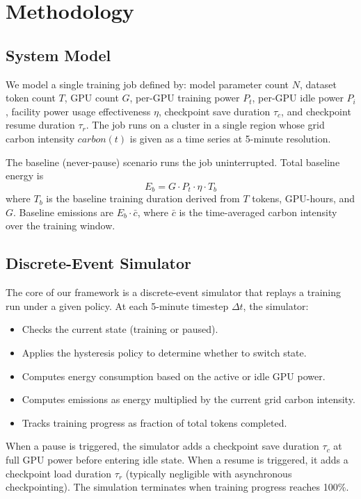 
\chapter{Methodology}
\label{sec:methodology}

\section{System Model}
\label{sec:system-model}

We model a single training job defined by: model parameter count $N$, dataset
token count $T$, GPU count $G$, per-GPU training power $P_t$, per-GPU idle
power $P_i$, facility power usage effectiveness $\eta$, checkpoint save duration $\tau_c$, and
checkpoint resume duration $\tau_r$.  The job runs on a cluster in a single
region whose grid carbon intensity $carbon(t)$ is given as a time series at
5-minute resolution.

The baseline (never-pause) scenario runs the job uninterrupted.  Total
baseline energy is
\[
E_b = G \cdot P_t \cdot \eta \cdot T_b
\]
where $T_b$ is the baseline training duration derived from $T$ tokens,
GPU-hours, and $G$.  Baseline emissions are $E_b \cdot \bar{c}$, where
$\bar{c}$ is the time-averaged carbon intensity over the training window.

\section{Discrete-Event Simulator}
\label{sec:simulator}

The core of our framework is a discrete-event simulator that replays a
training run under a given policy.  At each 5-minute timestep $\Delta t$, the
simulator:
\begin{itemize}
  \item Checks the current state (training or paused).
  \item Applies the hysteresis policy to determine whether to switch state.
  \item Computes energy consumption based on the active or idle GPU power.
  \item Computes emissions as energy multiplied by the current grid carbon
    intensity.
  \item Tracks training progress as fraction of total tokens completed.
\end{itemize}

When a pause is triggered, the simulator adds a checkpoint save duration
$\tau_c$ at full GPU power before entering idle state.  When a resume is
triggered, it adds a checkpoint load duration $\tau_r$ (typically negligible
with asynchronous checkpointing).  The simulation terminates when training
progress reaches 100\%.

